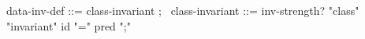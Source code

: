 \begin{syntax}
  data-inv-def ::= class-invariant ;
  \
  class-invariant ::= {inv-strength?} "class" "invariant" 
                      id "=" pred ";" 
\end{syntax}
